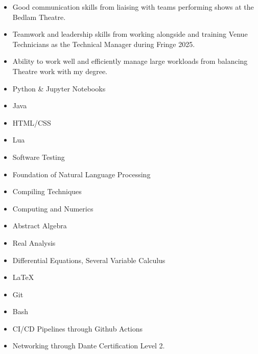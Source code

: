 \documentclass[../../cv-cs.tex]{subfiles}
\begin{document}
\begin{itemize}
	\item Good communication skills from liaising with teams performing shows at the Bedlam Theatre.
	\item Teamwork and leadership skills from working alongside and training Venue Technicians as the Technical Manager during Fringe 2025.
	\item Ability to work well and efficiently manage large workloads from balancing Theatre work with my degree. 
\end{itemize}

\begin{itemize}
	\item Python \& Jupyter Notebooks
	\item Java
	\item HTML/CSS
	\item Lua
\end{itemize}

\begin{itemize}
	\item Software Testing
	\item Foundation of Natural Language Processing
	\item Compiling Techniques
	\item Computing and Numerics
\end{itemize}

\begin{itemize}
	\item Abstract Algebra
	\item Real Analysis
	\item Differential Equations, Several Variable Calculus
\end{itemize}

\begin{itemize}
	\item LaTeX
	\item Git
	\item Bash
	\item CI/CD Pipelines through Github \newline Actions 
	\item Networking through Dante Certification Level 2.
\end{itemize}
\end{document}
